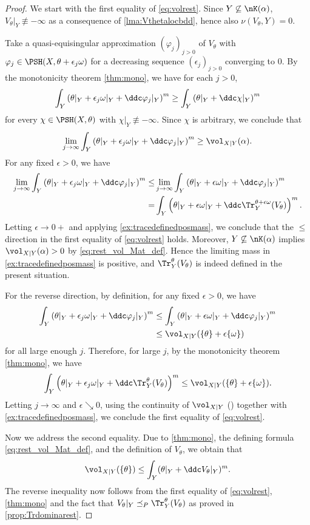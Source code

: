 \begin{proof}
We start with the first equality of \eqref{eq:volrest}. Since $Y\not\subseteq \nK(\alpha)$, $V_{\theta}|_Y \not \equiv -\infty$ as a consequence of \cref{lma:Vthetalocbdd}, hence also $\nu(V_{\theta},Y)=0$.

Take a quasi-equisingular approximation $(\varphi_j)_{j>0}$ of $V_{\theta}$ with $\varphi_j\in \PSH(X,\theta+\epsilon_j\omega)$ for a decreasing sequence $(\epsilon_j)_{j>0}$ converging to $0$. By the monotonicity theorem \cref{thm:mono}, we have for each $j>0$,
\[
    \int_Y \left(\theta|_Y+\epsilon_j\omega|_Y+\ddc \varphi_j|_Y\right)^m\geq \int_Y \left(\theta|_Y+\ddc\chi|_Y\right)^m
\]
for every $\chi\in \PSH(X,\theta)$ with $\chi|_Y\not\equiv -\infty$. Since $\chi$ is arbitrary, we conclude that
\[
    \lim_{j\to\infty}\int_Y \left(\theta|_Y+\epsilon_j\omega|_Y+\ddc \varphi_j|_Y\right)^m\geq \vol_{X|Y}(\alpha).
\]
For any fixed $\epsilon>0$, we have
\[
\begin{split}
\lim_{j\to\infty} \int_Y \left(\theta|_Y+\epsilon_j\omega|_Y+\ddc \varphi_j|_Y\right)^m\leq & \lim_{j\to\infty} \int_Y \left(\theta|_Y+\epsilon\omega|_Y+\ddc \varphi_j|_Y\right)^m\\
=& \int_Y \left(\theta|_Y+\epsilon\omega|_Y+\ddc \Tr_Y^{\theta+\epsilon\omega}(V_{\theta})\right)^m.
\end{split}
\]
Letting $\epsilon\to 0+$ and applying \cref{ex:tracedefinedposmass}, we conclude that the $\leq$ direction in the first equality of \eqref{eq:volrest} holds.
Moreover, $Y\not\subseteq \nK(\alpha)$ implies $\vol_{X|Y}(\alpha)>0$ by \eqref{eq:rest_vol_Mat_def}. Hence the limiting mass in \cref{ex:tracedefinedposmass} is positive, and $\Tr_Y^\theta(V_\theta)$ is indeed defined in the present situation.

   For the reverse direction, by definition, for any fixed $\epsilon>0$, we have
    \[
    \begin{aligned}
    \int_Y \left(\theta|_Y+\epsilon_j\omega|_Y+\ddc\varphi_j|_Y\right)^m
    &\leq \int_Y \left(\theta|_Y+\epsilon\omega|_Y+\ddc\varphi_j|_Y\right)^m\\
    &\leq \vol_{X|Y}(\{\theta\}+\epsilon\{\omega\})
    \end{aligned}
    \]
    for all large enough $j$. Therefore, for large $j$, by the monotonicity theorem \cref{thm:mono}, we have
    \[
        \int_Y \left(\theta|_Y+\epsilon_j\omega|_Y+\ddc \Tr_Y^{\theta}(V_{\theta})\right)^m\leq \vol_{X|Y}(\{\theta\}+\epsilon\{\omega\}).
    \]
    Letting $j\to\infty$ and $\epsilon \searrow 0$, using the continuity of $\vol_{X|Y}$ (\cite[Corollary~4.11]{Mat13}) together with \cref{ex:tracedefinedposmass}, we conclude the first equality of \eqref{eq:volrest}.

Now we address the second equality. Due to \cref{thm:mono}, the defining formula \eqref{eq:rest_vol_Mat_def}, and the definition of $V_\theta$, we obtain that
\[
\vol_{X|Y}(\{\theta\}) \leq \int_Y (\theta|_Y + \ddc V_\theta|_Y)^m.
\]
The reverse inequality now follows from the first equality of \eqref{eq:volrest}, \cref{thm:mono} and the fact that $V_\theta|_Y \preceq_P \Tr_Y^\theta(V_\theta)$ as proved in \cref{prop:Trdominarest}.
\end{proof}
